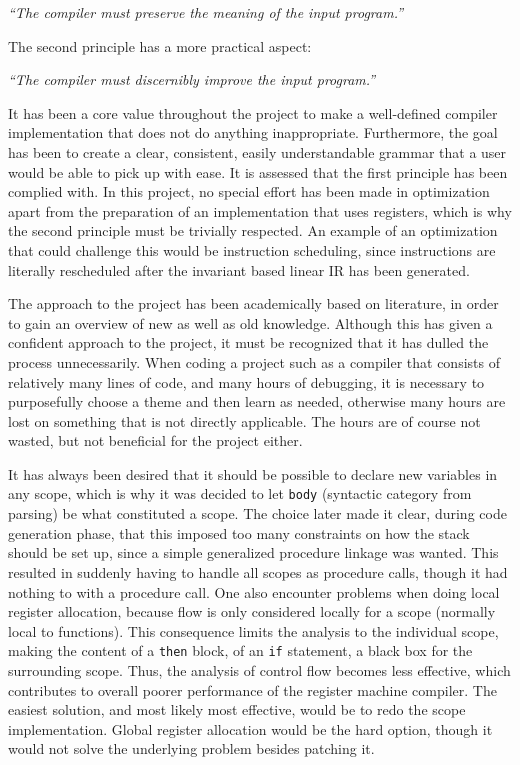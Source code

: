 \begin{displayquote}
    \textit{``The compiler must preserve the meaning of the input program.''}
\end{displayquote}
\hspace*{}

The second principle has a more practical aspect:

\begin{displayquote}
    \textit{``The compiler must discernibly improve the input program.''}
\end{displayquote}
\hspace*{}

It has been a core value throughout the project to make a well-defined compiler implementation that does not do anything inappropriate. Furthermore, the goal has been to create a clear, consistent, easily understandable grammar that a user would be able to pick up with ease. It is assessed that the first principle has been complied with. In this project, no special effort has been made in optimization apart from the preparation of an implementation that uses registers, which is why the second principle must be trivially respected. An example of an optimization that could challenge this would be instruction scheduling, since instructions are literally rescheduled after the invariant based linear IR has been generated.

The approach to the project has been academically based on literature, in order to gain an overview of new as well as old knowledge. Although this has given a confident approach to the project, it must be recognized that it has dulled the process unnecessarily. When coding a project such as a compiler that consists of relatively many lines of code, and many hours of debugging, it is necessary to purposefully choose a theme and then learn as needed, otherwise many hours are lost on something that is not directly applicable. The hours are of course not wasted, but not beneficial for the project either.

It has always been desired that it should be possible to declare new variables in any scope, which is why it was decided to let \texttt{body} (syntactic category from parsing) be what constituted a scope. The choice later made it clear, during code generation phase, that this imposed too many constraints on how the stack should be set up, since a simple generalized procedure linkage was wanted. This resulted in suddenly having to handle all scopes as procedure calls, though it had nothing to with a procedure call. One also encounter problems when doing local register allocation, because flow is only considered locally for a scope (normally local to functions). This consequence limits the analysis to the individual scope, making the content of a \texttt{then} block, of an \texttt{if} statement, a black box for the surrounding scope. Thus, the analysis of control flow becomes less effective, which contributes to overall poorer performance of the register machine compiler. The easiest solution, and most likely most effective, would be to redo the scope implementation. Global register allocation would be the hard option, though it would not solve the underlying problem besides patching it.

